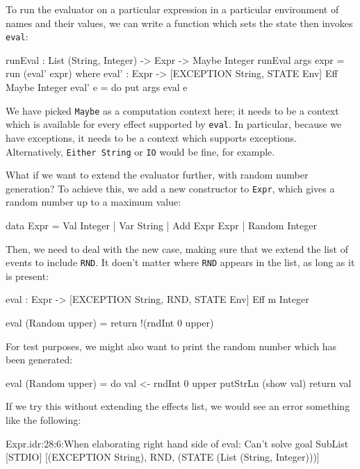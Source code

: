 To run the evaluator on a particular expression in a particular environment
of names and their values, we can write a function which sets the state then
invokes \texttt{eval}:

\begin{code}
runEval : List (String, Integer) -> Expr -> Maybe Integer
runEval args expr = run (eval' expr)
  where eval' : Expr -> { [EXCEPTION String, STATE Env] } Eff Maybe Integer
        eval' e = do put args
                     eval e
\end{code}

We have picked \texttt{Maybe} as a computation context here; it needs to
be a context which is available for every effect supported by \texttt{eval}.
In particular, because we have exceptions, it needs to be a context which
supports exceptions. Alternatively, \texttt{Either String} or \texttt{IO}
would be fine, for example.

What if we want to extend the evaluator further, with random number generation?
To achieve this, we add a new constructor to \texttt{Expr}, which gives
a random number up to a maximum value:

\begin{code}
data Expr = Val Integer
          | Var String
          | Add Expr Expr
          | Random Integer
\end{code}

\noindent
Then, we need to deal with the new case, making sure that we extend the
list of events to include \texttt{RND}. It doen't matter where \texttt{RND}
appears in the list, as long as it is present:

\begin{code}
eval : Expr -> { [EXCEPTION String, RND, STATE Env] } Eff m Integer

eval (Random upper) = return !(rndInt 0 upper)
\end{code}

\noindent
For test purposes, we might also want to print the random number which has
been generated:

\begin{code}
eval (Random upper) = do val <- rndInt 0 upper
                         putStrLn (show val)
                         return val
\end{code}

\noindent
If we try this without extending the effects list, we would see an error
something like the following:

\begin{code}
Expr.idr:28:6:When elaborating right hand side of eval:
Can't solve goal 
   SubList [STDIO]
           [(EXCEPTION String), RND, (STATE (List (String, Integer)))]
\end{code}

